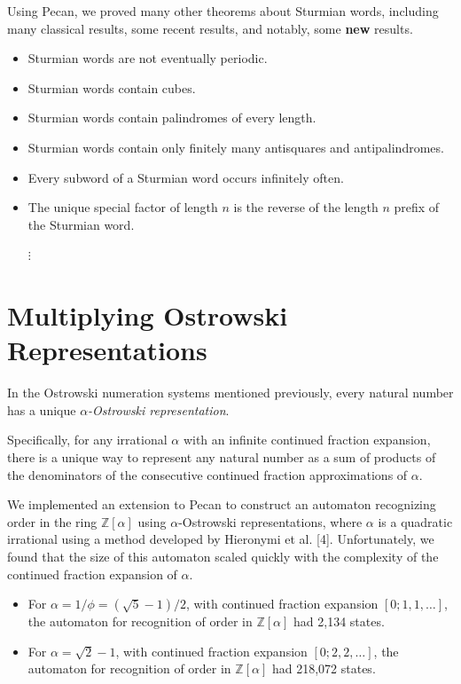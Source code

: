 \documentclass[landscape,usenames,dvipsnames]{sciposter}
\begin{document}
\begin{multicols}{3}
Using Pecan, we proved many other theorems about Sturmian words, including many classical results, some recent results, and notably, some \textbf{new} results.
    \begin{itemize}
        \item Sturmian words are not eventually periodic.
        \item Sturmian words contain cubes.
        \item Sturmian words contain palindromes of every length.
        \item Sturmian words contain only finitely many antisquares and antipalindromes.
        \item Every subword of a Sturmian word occurs infinitely often.
        \item The unique special factor of length $n$ is the reverse of the length $n$ prefix of the Sturmian word.
        \item[$\vdots$]
    \end{itemize}

\section*{Multiplying Ostrowski Representations}

In the Ostrowski numeration systems mentioned previously, every natural number has a unique \emph{$\alpha$-Ostrowski representation}.

Specifically, for any irrational $\alpha$ with an infinite continued fraction expansion, there is a unique way to represent any natural number as a sum of products of the denominators of the consecutive continued fraction approximations of $\alpha$.

We implemented an extension to Pecan to construct an automaton recognizing order in the ring $\mathbb Z [ \alpha ]$ using $\alpha$-Ostrowski representations, where $\alpha$ is a quadratic irrational using a method developed by Hieronymi et al. [4]. 
Unfortunately, we found that the size of this automaton scaled quickly with the complexity of the continued fraction expansion of $\alpha$.

\begin{itemize}
    \item For $\alpha = 1/\phi = (\sqrt 5 - 1)/2$, with continued fraction expansion $[0;1,1,\dots]$, the automaton for recognition of order in $\mathbb Z [ \alpha ] $ had 2,134 states.
    
    \item For $\alpha = \sqrt 2 - 1$, with continued fraction expansion $[0;2,2,\dots]$, the automaton for recognition of order in $\mathbb Z [ \alpha ] $ had 218,072 states.
    

\end{itemize}
\end{multicols}
\end{document}
